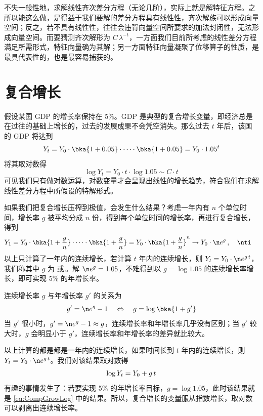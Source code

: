 不失一般性地，求解线性齐次差分方程（无论几阶），实际上就是解特征方程。之所以能这么做，是得益于我们要解的差分方程具有线性性，齐次解族可以形成向量空间；反之，若不具有线性性，往往会违背向量空间所要求的加法封闭性，无法形成向量空间。而要猜测齐次解形为 \(C\,\lambda^{-t}\)，一方面我们目前所考虑的线性差分方程满足所需形式，特征向量确为其解；另一方面特征向量凝聚了位移算子的性质，是最具代表性的，也是最容易捕获的。

\section{复合增长}\label{sec:CompGrow}

假设某国 GDP 的增长率保持在 5\%。GDP 是典型的复合增长变量，即经济总是在过往的基础上增长的，过去的发展成果不会凭空消失。那么过去 \(t\) 年后，该国的 GDP 将达到
\begin{equation}
    Y_t = Y_0 \cdot \bka{1+0.05}\cdot  \cdots\cdot \bka{1+0.05}=Y_0 \cdot 1.05^t\notag
\end{equation}
将其取对数得
\begin{equation}
    \log Y_t=Y_0 \cdot t\cdot\log 1.05\sim C\cdot t \label{eq:CompGrowLog}
\end{equation}
可见我们只有做对数运算，对数变量才会呈现出线性的增长趋势，符合我们在求解线性差分方程中所假设的特解形式。

如果我们把复合增长压榨到极值，会发生什么结果？考虑一年内有 \(n\) 个单位时间，增长率 \(g\) 被平均分成 \(n\) 份，得到每个单位时间的增长率，再进行复合增长，得到
\begin{align}
    Y_1 &= Y_0 \cdot \bka{1+\frac{g}{n}} \cdot \dots \cdot \bka{1+\frac{g}{n}}= Y_0 \cdot \bka{1+\frac{g}{n}}^n\to Y_0 \cdot \n e^{g}\,, \quad \nti\notag
\end{align}
以上只计算了一年内的连续增长，若计算 \(t\) 年内的连续增长，则 \(Y_t=Y_0 \cdot \n e^{g\,t}\)，我们称其中 \(g\) 为\,\,或\,。解 \(\n e^g=1.05\)，不难得到以 \(g=\log 1.05\) 的连续增长率增长，即可实现 5\% 的年增长率。

连续增长率 \(g\) 与年增长率 \(g'\) 的关系为
\begin{equation}
    g' = \n e^g - 1 \quad \Leftrightarrow \quad g = \log\bka{1+g'}
\end{equation}
当 \(g'\) 很小时，\(g'=\n e^g-1\approx g\)，连续增长率和年增长率几乎没有区别；当 \(g'\) 较大时，\(g\) 会明显小于 \(g'\)，连续增长率和年增长率的差异就比较大。

以上计算的都是都是一年内的连续增长，如果时间长到 \(t\) 年内的连续增长，则 \(Y_t=Y_0 \cdot \n e^{g\,t}\)。我们对该结果取对数得
\begin{align}
    \log Y_t=Y_0 + g\,t \notag
\end{align}
有趣的事情发生了：若要实现 5\% 的年增长率目标，\(g=\log1.05\)，此时该结果就是 \ref{eq:CompGrowLog} 中的结果。所以，复合增长的变量服从指数增长，取对数可以剥离出连续增长率。


\SymmetricGeometry
